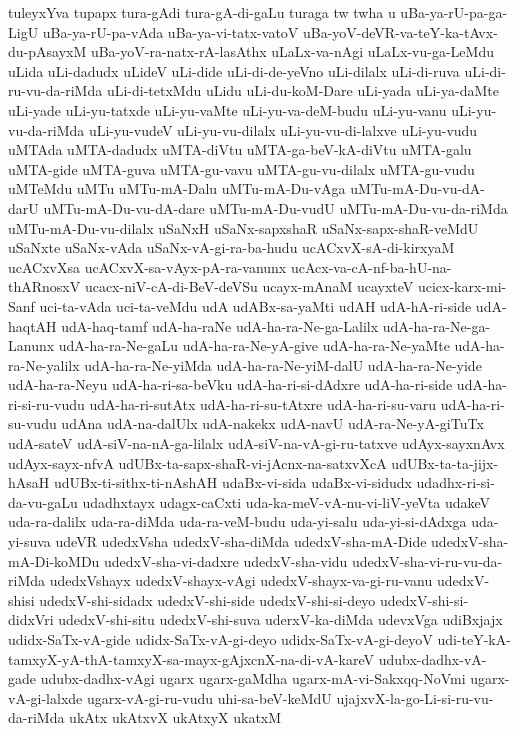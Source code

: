 {tuleyxYva
tupapx
tura-gAdi
tura-gA-di-gaLu
turaga
tw
twha
u
uBa-ya-rU-pa-ga-LigU
uBa-ya-rU-pa-vAda
uBa-ya-vi-tatx-vatoV
uBa-yoV-deVR-va-teY-ka-tAvx-du-pAsayxM
uBa-yoV-ra-natx-rA-lasAthx
uLaLx-va-nAgi
uLaLx-vu-ga-LeMdu
uLida
uLi-dadudx
uLideV
uLi-dide
uLi-di-de-yeVno
uLi-dilalx
uLi-di-ruva
uLi-di-ru-vu-da-riMda
uLi-di-tetxMdu
uLidu
uLi-du-koM-Dare
uLi-yada
uLi-ya-daMte
uLi-yade
uLi-yu-tatxde
uLi-yu-vaMte
uLi-yu-va-deM-budu
uLi-yu-vanu
uLi-yu-vu-da-riMda
uLi-yu-vudeV
uLi-yu-vu-dilalx
uLi-yu-vu-di-lalxve
uLi-yu-vudu
uMTAda
uMTA-dadudx
uMTA-diVtu
uMTA-ga-beV-kA-diVtu
uMTA-galu
uMTA-gide
uMTA-guva
uMTA-gu-vavu
uMTA-gu-vu-dilalx
uMTA-gu-vudu
uMTeMdu
uMTu
uMTu-mA-Dalu
uMTu-mA-Du-vAga
uMTu-mA-Du-vu-dA-darU
uMTu-mA-Du-vu-dA-dare
uMTu-mA-Du-vudU
uMTu-mA-Du-vu-da-riMda
uMTu-mA-Du-vu-dilalx
uSaNxH
uSaNx-sapxshaR
uSaNx-sapx-shaR-veMdU
uSaNxte
uSaNx-vAda
uSaNx-vA-gi-ra-ba-hudu
ucACxvX-sA-di-kirxyaM
ucACxvXsa
ucACxvX-sa-vAyx-pA-ra-vanunx
ucAcx-va-cA-nf-ba-hU-na-thARnosxV
ucacx-niV-cA-di-BeV-deVSu
ucayx-mAnaM
ucayxteV
ucicx-karx-mi-Sanf
uci-ta-vAda
uci-ta-veMdu
udA
udABx-sa-yaMti
udAH
udA-hA-ri-side
udA-haqtAH
udA-haq-tamf
udA-ha-raNe
udA-ha-ra-Ne-ga-Lalilx
udA-ha-ra-Ne-ga-Lanunx
udA-ha-ra-Ne-gaLu
udA-ha-ra-Ne-yA-give
udA-ha-ra-Ne-yaMte
udA-ha-ra-Ne-yalilx
udA-ha-ra-Ne-yiMda
udA-ha-ra-Ne-yiM-dalU
udA-ha-ra-Ne-yide
udA-ha-ra-Neyu
udA-ha-ri-sa-beVku
udA-ha-ri-si-dAdxre
udA-ha-ri-side
udA-ha-ri-si-ru-vudu
udA-ha-ri-sutAtx
udA-ha-ri-su-tAtxre
udA-ha-ri-su-varu
udA-ha-ri-su-vudu
udAna
udA-na-dalUlx
udA-nakekx
udA-navU
udA-ra-Ne-yA-giTuTx
udA-sateV
udA-siV-na-nA-ga-lilalx
udA-siV-na-vA-gi-ru-tatxve
udAyx-sayxnAvx
udAyx-sayx-nfvA
udUBx-ta-sapx-shaR-vi-jAcnx-na-satxvXcA
udUBx-ta-ta-jijx-hAsaH
udUBx-ti-sithx-ti-nAshAH
udaBx-vi-sida
udaBx-vi-sidudx
udadhx-ri-si-da-vu-gaLu
udadhxtayx
udagx-caCxti
uda-ka-meV-vA-nu-vi-liV-yeVta
udakeV
uda-ra-dalilx
uda-ra-diMda
uda-ra-veM-budu
uda-yi-salu
uda-yi-si-dAdxga
uda-yi-suva
udeVR
udedxVsha
udedxV-sha-diMda
udedxV-sha-mA-Dide
udedxV-sha-mA-Di-koMDu
udedxV-sha-vi-dadxre
udedxV-sha-vidu
udedxV-sha-vi-ru-vu-da-riMda
udedxVshayx
udedxV-shayx-vAgi
udedxV-shayx-va-gi-ru-vanu
udedxV-shisi
udedxV-shi-sidadx
udedxV-shi-side
udedxV-shi-si-deyo
udedxV-shi-si-didxVri
udedxV-shi-situ
udedxV-shi-suva
uderxV-ka-diMda
udevxVga
udiBxjajx
udidx-SaTx-vA-gide
udidx-SaTx-vA-gi-deyo
udidx-SaTx-vA-gi-deyoV
udi-teY-kA-tamxyX-yA-thA-tamxyX-sa-mayx-gAjxcnX-na-di-vA-kareV
udubx-dadhx-vA-gade
udubx-dadhx-vAgi
ugarx
ugarx-gaMdha
ugarx-mA-vi-Sakxqq-NoVmi
ugarx-vA-gi-lalxde
ugarx-vA-gi-ru-vudu
uhi-sa-beV-keMdU
ujajxvX-la-go-Li-si-ru-vu-da-riMda
ukAtx
ukAtxvX
ukAtxyX
ukatxM
}

